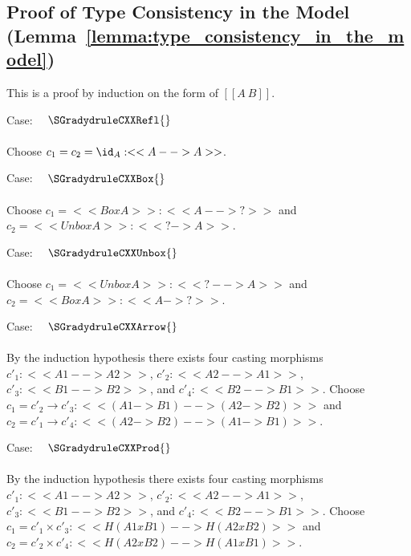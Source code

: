 \subsection{Proof of Type Consistency in the Model (Lemma~\ref{lemma:type_consistency_in_the_model})}
\label{subsec:proof_of_type_consistency_in_the_model}
This is a proof by induction on the form of $[[A ~ B]]$.
\begin{description}
\item Case: $\quad \SGradydruleCXXRefl{}$\\
  \ \\
  \noindent  
  Choose $c_1 = c_2 = \id_A : <<A --> A>>$.
  \ \\
\item Case: $\quad \SGradydruleCXXBox{}$\\
  \ \\
  \noindent
  Choose $c_1 = <<Box A>> : <<A --> ?>>$ and $c_2 = <<Unbox A>> : <<? -> A>>$.
  \ \\
\item Case: $\quad \SGradydruleCXXUnbox{}$\\
  \ \\
  \noindent
  Choose $c_1 = <<Unbox A>> : <<? --> A>>$ and $c_2 = <<Box A>> : <<A -> ?>>$.
  \ \\
\item Case: $\quad \SGradydruleCXXArrow{}$\\
  \ \\
  \noindent  
  By the induction hypothesis there exists four casting morphisms
  $c'_1 : <<A1 --> A2>>$, $c'_2 : <<A2 --> A1>>$, $c'_3 : <<B1 --> B2>>$,
  and $c'_4 : <<B2 --> B1>>$.  Choose
  $c_1 = c'_2 \to c'_3 : <<(A1 -> B1) --> (A2 -> B2)>>$
  and
  $c_2 = c'_1 \to c'_4 : <<(A2 -> B2) --> (A1 -> B1)>>$.
  \ \\
\item Case: $\quad \SGradydruleCXXProd{}$\\
  \ \\
  \noindent  
  By the induction hypothesis there exists four casting morphisms
  $c'_1 : <<A1 --> A2>>$, $c'_2 : <<A2 --> A1>>$, $c'_3 : <<B1 --> B2>>$,
  and $c'_4 : <<B2 --> B1>>$.
  Choose
  $c_1 = c'_1 \times c'_3 : <<H(A1 x B1) --> H(A2 x B2)>>$
  and
  $c_2 = c'_2 \times c'_4 : <<H(A2 x B2) --> H(A1 x B1)>>$.
\end{description}

